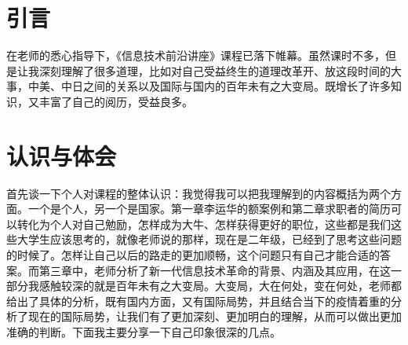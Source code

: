 \documentclass{article}
\begin{document}
\thispagestyle{empty}
\newpage
\setcounter{page}{1}
\section{引言}
在老师的悉心指导下，《信息技术前沿讲座》课程已落下帷幕。虽然课时不多，但是让我深刻理解了很多道理，比如对自己受益终生的道理改革开、放这段时间的大事，中美、中日之间的关系以及国际与国内的百年未有之大变局。既增长了许多知识，又丰富了自己的阅历，受益良多。

\section{认识与体会}
首先谈一下个人对课程的整体认识：我觉得我可以把我理解到的内容概括为两个方面。一个是个人，另一个是国家。第一章李运华的额案例和第二章求职者的简历可以转化为个人对自己勉励，怎样成为大牛、怎样获得更好的职位，这些都是我们这些大学生应该思考的，就像老师说的那样，现在是二年级，已经到了思考这些问题的时候了。怎样让自己以后的路走的更加顺畅，这个问题只有自己才能合适的答案。而第三章中，老师分析了新一代信息技术革命的背景、内涵及其应用，在这一部分我感触较深的就是百年未有之大变局。大变局，大在何处，变在何处，老师都给出了具体的分析，既有国内方面，又有国际局势，并且结合当下的疫情着重的分析了现在的国际局势，让我们有了更加深刻、更加明白的理解，从而可以做出更加准确的判断。下面我主要分享一下自己印象很深的几点。\par

\end{document}
